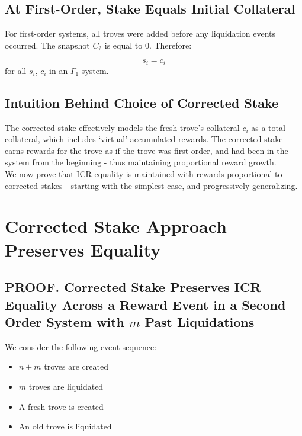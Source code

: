 \documentclass[reqno]{article}
\begin{document}
\subsection{At First-Order, Stake Equals Initial Collateral}

For first-order systems, all troves were added before any liquidation events occurred. The snapshot $C_\emptyset$ is equal to 0. Therefore:

\begin{equation} 
    s_i=c_i
\end{equation}
for all $s_i$, $c_i$ in an $\Gamma_1$ system.

\subsection{Intuition Behind Choice of Corrected Stake}


The corrected stake effectively models the fresh trove’s collateral $c_i$ as a total collateral, which includes ‘virtual’ accumulated rewards. The corrected stake earns rewards for the trove as if the trove was first-order, and had been in the system from the beginning - thus maintaining proportional reward growth.\\

We now prove that ICR equality is maintained with rewards proportional to corrected stakes - starting with the simplest case, and progressively generalizing.

\section{Corrected Stake Approach Preserves Equality}

\subsection{PROOF. Corrected Stake Preserves ICR Equality Across a Reward Event in a Second Order System with $m$ Past Liquidations}

We consider the following event sequence:

\begin{itemize}
  \item $n+m$ troves are created
  \item $m$ troves are liquidated
  \item A fresh trove is created
  \item An old trove is liquidated
\end{itemize}
\end{document}
